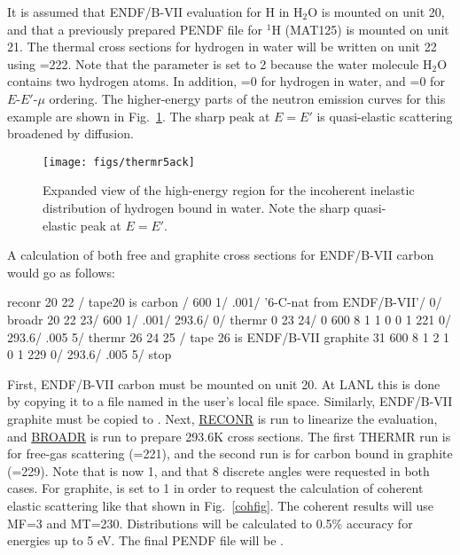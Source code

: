\noindent
It is assumed that ENDF/B-VII evaluation for H in H$_2$O is
mounted on unit 20, and that a previously prepared PENDF file
for $^1$H (MAT125) is mounted on unit 21.  The thermal cross
sections for hydrogen in water will be written on unit 22
using =222.  Note that the parameter 
is set to 2 because the water molecule H$_2$O contains two
hydrogen atoms.  In addition, =0 for
hydrogen in water, and =0 for $E$-$E'$-$\mu$
ordering.  The higher-energy parts of the neutron emission
curves for this example are shown in Fig.~\ref{water}.  The sharp
peak at $E{=}E'$ is quasi-elastic scattering broadened by
diffusion.

\begin{figure}[thb]\centering
\texttt{[image: figs/thermr5ack]}
\caption[Incoherent inelastic distribution for H-H$_2$O (expanded view)]
 {Expanded view of the high-energy region for the incoherent inelastic
 distribution of hydrogen bound in water.  Note the sharp quasi-elastic
 peak at $E{=}E'$.}
\label{water}
\end{figure}

A calculation of both free and graphite cross sections for ENDF/B-VII
carbon would go as follows:

\small
\begin{ccode}

 reconr
 20 22 / tape20 is carbon
 /
 600 1/
 .001/
 '6-C-nat from ENDF/B-VII'/
 0/
 broadr
 20 22 23/
 600 1/
 .001/
 293.6/
 0/
 thermr
 0 23 24/
 0 600 8 1 1 0 0 1 221 0/
 293.6/
 .005 5/
 thermr
 26 24 25 / tape 26 is ENDF/B-VII graphite
 31 600 8 1 2 1 0 1 229 0/
 293.6/
 .005 5/
 stop

\end{ccode}
\normalsize

\noindent
First, ENDF/B-VII carbon must be mounted on unit 20.  At LANL
this is done by copying it to a file named  in the
user's local file space.  Similarly,  ENDF/B-VII graphite must be copied
to .  Next, \hyperlink{sRECONRhy}{RECONR} is run
to linearize the evaluation, and \hyperlink{sBROADRhy}{BROADR}
is run to prepare 293.6K cross sections.  The first THERMR
run is for free-gas scattering (=221), and the second run
is for carbon bound in graphite (=229).  Note that
 is now 1, and that 8 discrete angles were requested
in both cases.   For graphite,  is set to 1 in order to
request the calculation of coherent elastic scattering like that shown
in Fig.~\ref{cohfig}.  The coherent results will use MF=3 and MT=230.
Distributions will be calculated to 0.5\% accuracy for energies up
to 5 eV.  The final PENDF file will be .

